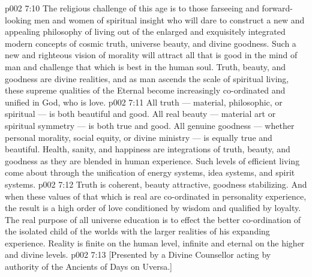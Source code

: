 \vs p002 7:10 The religious challenge of this age is to those farseeing and forward\hyp{}looking men and women of spiritual insight who will dare to construct a new and appealing philosophy of living out of the enlarged and exquisitely integrated modern concepts of cosmic truth, universe beauty, and divine goodness. Such a new and righteous vision of morality will attract all that is good in the mind of man and challenge that which is best in the human soul. Truth, beauty, and goodness are divine realities, and as man ascends the scale of spiritual living, these supreme qualities of the Eternal become increasingly co\hyp{}ordinated and unified in God, who is love.
\vs p002 7:11 \pc All truth --- material, philosophic, or spiritual --- is both beautiful and good. All real beauty --- material art or spiritual symmetry --- is both true and good. All genuine goodness --- whether personal morality, social equity, or divine ministry --- is equally true and beautiful. Health, sanity, and happiness are integrations of truth, beauty, and goodness as they are blended in human experience. Such levels of efficient living come about through the unification of energy systems, idea systems, and spirit systems.
\vs p002 7:12 Truth is coherent, beauty attractive, goodness stabilizing. And when these values of that which is real are co\hyp{}ordinated in personality experience, the result is a high order of love conditioned by wisdom and qualified by loyalty. The real purpose of all universe education is to effect the better co\hyp{}ordination of the isolated child of the worlds with the larger realities of his expanding experience. Reality is finite on the human level, infinite and eternal on the higher and divine levels.
\vsetoff
\vs p002 7:13 [Presented by a Divine Counsellor acting by authority of the Ancients of Days on Uversa.]
\quizlink
{}
